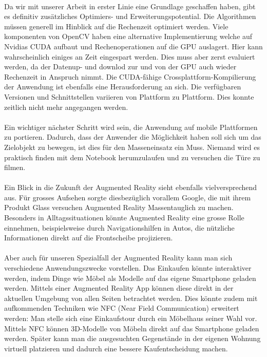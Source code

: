 \noindent\paragraph{}
Da wir mit unserer Arbeit in erster Linie eine Grundlage geschaffen haben, gibt es definitiv zusätzliches Optimiers- und Erweiterungspotential. Die Algorithmen müssen generell im Hinblick auf die Rechenzeit optimiert werden. Viele komponenten von OpenCV haben eine alternative Implementierung welche auf Nvidias CUDA aufbaut und Rechenoperationen auf die GPU auslagert. Hier kann wahrscheinlich einiges an Zeit eingespart werden. Dies muss aber zerst evaluiert werden, da der Datenup- und downlod zur und von der GPU auch wieder Rechenzeit in Anspruch nimmt. Die CUDA-fähige Crossplattform-Kompilierung der Anwendung ist ebenfalls eine Herausforderung an sich. Die verfügbaren Versionen und Schnittstellen variieren von Plattform zu Plattform. Dies konnte zeitlich nicht mehr angegangen werden.
\noindent\paragraph{}
Ein wichtiger nächster Schritt wird sein, die Anwendung auf mobile Plattformen zu portieren. Dadurch, dass der Anwender die Möglichkeit haben soll sich um das Zielobjekt zu bewegen, ist dies für den Masseneinsatz ein Muss. Niemand wird es praktisch finden mit dem Notebook herumzulaufen und zu versuchen die Türe zu filmen.
\noindent\paragraph{}
Ein Blick in die Zukunft der Augmented Reality sieht ebenfalls vielversprechend aus. Für grosses Aufsehen sorgte diesbezüglich vorallem Google, die mit ihrem Produkt Glass versuchen Augmented Reality Massentauglich zu machen. Besonders in Alltagssituationen könnte Augmented Reality eine grosse Rolle einnehmen, beispielsweise durch Navigationshilfen in Autos, die nützliche Informationen direkt auf die Frontscheibe projizieren.
\noindent\paragraph{}
Aber auch für unseren Spezialfall der Augmented Reality kann man sich verschiedene Anwendungszwecke vorstellen. Das Einkaufen könnte interaktiver werden, indem Dinge wie Möbel als Modelle auf das eigene Smartphone geladen werden. Mittels einer Augmented Reality App können diese direkt in der aktuellen Umgebung von allen Seiten betrachtet werden. Dies könnte zudem mit aufkommenden Techniken wie NFC (Near Field Communication) erweitert werden: Man stelle sich eine Einkaufstour durch ein Möbelhaus seiner Wahl vor. Mittels NFC können 3D-Modelle von Möbeln direkt auf das Smartphone geladen werden. Später kann man die ausgesuchten Gegenstände in der eigenen Wohnung virtuell platzieren und dadurch eine bessere Kaufentscheidung machen.